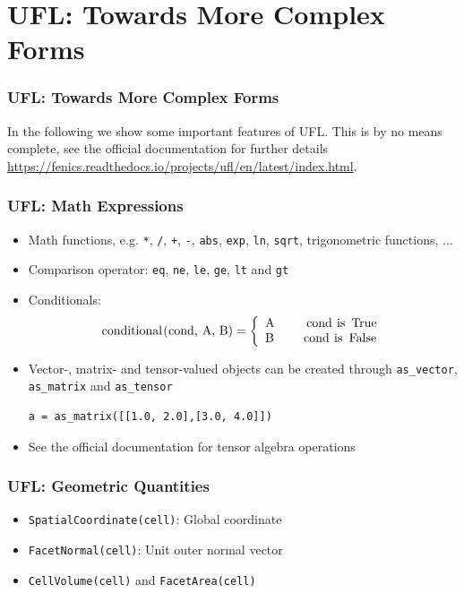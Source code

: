 \documentclass[ignorenonframetext,11pt]{beamer}
\theoremstyle{definition}
\begin{document}
\section{UFL: Towards More Complex Forms}

\begin{frame}
  \frametitle{UFL: Towards More Complex Forms}
  In the following we show some important features of UFL. This is by no means
  complete, see the official documentation for further details
  \url{https://fenics.readthedocs.io/projects/ufl/en/latest/index.html}.
\end{frame}

\begin{frame}[fragile]
  \frametitle{UFL: Math Expressions}
  \begin{itemize}
  \item Math functions, e.g. \lstinline{*}, \lstinline{/}, \lstinline{+},
    \lstinline{-}, \lstinline{abs}, \lstinline{exp}, \lstinline{ln},
    \lstinline{sqrt}, trigonometric functions, ...
  \item Comparison operator: \lstinline{eq}, \lstinline{ne}, \lstinline{le},
    \lstinline{ge}, \lstinline{lt} and \lstinline{gt}
  \item Conditionals:
    \begin{displaymath}
      \text{\lstinline{conditional(cond, A, B)}} = \left\{
        \begin{array}{lr}
          \text{\lstinline{A}}\ \ \ \ & \text{\lstinline{cond is True}} \\
          \text{\lstinline{B}} & \text{\lstinline{cond is False}}
        \end{array}
      \right.
    \end{displaymath}
  \item Vector-, matrix- and tensor-valued objects can be created through
    \lstinline{as_vector}, \lstinline{as_matrix} and \lstinline{as_tensor}
    \begin{lstlisting}
a = as_matrix([[1.0, 2.0],[3.0, 4.0]])
    \end{lstlisting}
  \item See the official documentation for tensor algebra operations
  \end{itemize}
\end{frame}

\begin{frame}[fragile]
  \frametitle{UFL: Geometric Quantities}
  \begin{itemize}
  \item \lstinline{SpatialCoordinate(cell)}: Global coordinate
  \item \lstinline{FacetNormal(cell)}: Unit outer normal vector
  \item \lstinline{CellVolume(cell)} and   \lstinline{FacetArea(cell)}
  \end{itemize}
\end{frame}
\end{document}
